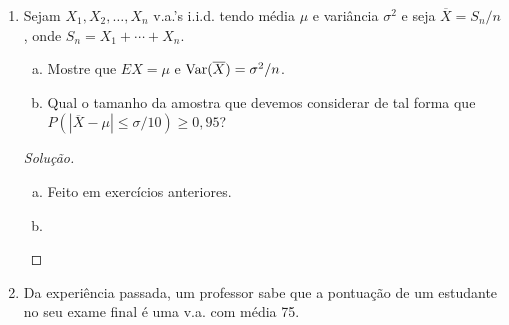 \documentclass[../Notas.tex]{subfiles}
\begin{document}
\begin{enumerate}
\begin{proof}[Solução]
\begin{enumerate}[a)]
\begin{align*}
                           = \prod_{i=1}^n \frac{1}{1 - t/\lambda}
                           =  \frac{1}{(1 - t/\lambda)^n}
                           = \left(\frac{\lambda}{\lambda - t}\right)^n, \, t < \lambda.
            \end{align*}
            Portanto, $S_n\sim\Gamma(n, \lambda)$.
            \item Temos
            \begin{align*}
                M_{S_n}(t) = \prod_{i=1}^n M_{X_i}(t)
                           = \prod_{i=1}^n (pe^t + 1 - p)^{n_i}
                           = (pe^t + 1 - p)^{\sum_i n_i}, \, \forall t\in\mathbb{R}.
            \end{align*}
            Portanto, $S_n\sim B\left( \sum_i n_i, p \right)$.
            \item Temos
            \begin{align*}
                M_{S_n}(t) = \prod_{i=1}^n M_{X_i}(t)
                           = \prod_{i=1}^n \exp(\lambda_i(e^t - 1))
                           = \exp\left[ (e^t - 1)\sum_i \lambda_i \right], \, 
                           \forall t\in\mathbb{R}.
            \end{align*}
            Portanto, $S_n\sim\text{Poisson}\left(\sum_i\lambda_i\right)$.
        \end{enumerate}
    \end{proof}
    \item Sejam $X_1, X_2,\dots, X_n$ v.a.'s i.i.d. tendo média $\mu$ e variância $\sigma^2$ e seja $\overline{X} = S_n/n$, onde $S_n = X_1 + \cdots + X_n$.
    \begin{enumerate}[a)]
    \item Mostre que $EX = \mu$ e $\text{Var}(\overline{X}) = \sigma^2/n$.
    \item Qual o tamanho da amostra que devemos considerar de tal forma que $P(|\overline{X} - \mu| \leq \sigma/10) \geq 0,95$?
    \end{enumerate}
    \begin{proof}[Solução]
        \begin{enumerate}[a)]
            \item Feito em exercícios anteriores.
            \item 
        \end{enumerate}
    \end{proof}
    \item Da experiência passada, um professor sabe que a pontuação de um estudante no seu exame final é uma v.a. com média 75.

\end{enumerate}
\end{document}
